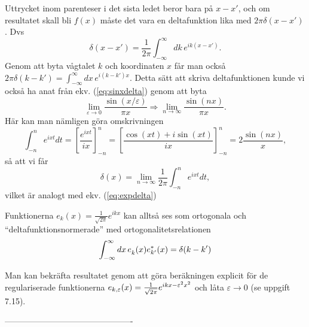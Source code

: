 \documentclass[%
oneside,                 %
final,                   %
10pt]{article}
\begin{document}
Uttrycket inom parenteser i det sista ledet beror bara på $x-x'$, och om resultatet skall bli $f(x)$ måste det vara en deltafunktion lika med $2\pi\delta(x-x')$. Dvs
\begin{equation}
\delta(x-x') = \frac{1}{2\pi} \int_{-\infty}^\infty dk\,e^{ik(x-x')}.
\label{eq:expdelta}
\end{equation}
Genom att byta vågtalet $k$ och koordinaten $x$ får man också $2\pi \delta(k-k') = \int_{-\infty}^\infty dx\,e^{i(k-k')x}$. Detta sätt att skriva deltafunktionen kunde vi också ha anat från ekv. (\ref{eq:sinxdelta}) genom att byta 
$$
\lim_{\varepsilon \to 0} \frac{\sin(x/\varepsilon)}{\pi x} \Rightarrow \lim_{n \to \infty} \frac{\sin(n x)}{\pi x}.
$$
Här kan man nämligen göra omskrivningen
\begin{equation}
\int_{-n}^n e^{i x t} dt = \left[ \frac{e^{ixt}}{ix} \right]_{-n}^n 
= \left[ \frac{\cos(xt)+i\sin(xt)}{ix} \right]_{-n}^n 
= 2 \frac{\sin(nx)}{x},
\end{equation}
så att vi får
\begin{equation}
\delta(x) = \lim_{n \to \infty} \frac{1}{2\pi} \int_{-n}^n e^{i x t} dt,
\end{equation}
vilket är analogt med ekv. (\ref{eq:expdelta})

Funktionerna $e_k(x)=\frac{1}{\sqrt{2\pi}}e^{ikx}$ kan alltså ses som ortogonala och ``deltafunktionsnormerade'' med ortogonalitetsrelationen
$$
\int_{-\infty}^\infty dx\,e^{\mathstrut}_k(x)e^*_{k'}(x)=\delta(k-k')
$$

Man kan bekräfta resultatet genom att göra beräkningen explicit 
för de regulariserade funktionerna $e_{k,\varepsilon}(x)={1\over\sqrt{2\pi}}e^{ikx-\varepsilon^2x^2}$ och låta $\varepsilon\rightarrow0$ (se uppgift 7.15). 

----------------------------------------------



\printindex
\end{document}
